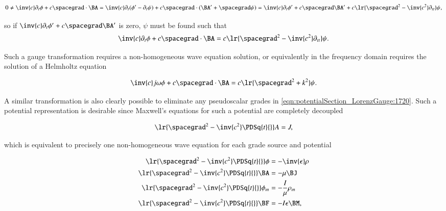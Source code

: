 \begin{dmath}\label{eqn:potentialSection_LorenzGauge:1680}
0 \ne
\inv{c} \partial_t \phi + c \spacegrad \cdot \BA
=
\inv{c} \partial_t (\phi' - \partial_t \psi) + c \spacegrad \cdot (\BA' + \spacegrad \psi)
=
\inv{c} \partial_t \phi' + c \spacegrad \BA'
+ c \lr{ \spacegrad^2 - \inv{c^2} \partial_{tt} } \psi,
\end{dmath}

so if \( \inv{c} \partial_t \phi' + c \spacegrad \BA' \) is zero, \( \psi \) must be found such that
\begin{dmath}\label{eqn:potentialSection_LorenzGauge:1700}
\inv{c} \partial_t \phi + c \spacegrad \cdot \BA
= c \lr{ \spacegrad^2 - \inv{c^2} \partial_{tt} } \psi.
\end{dmath}

Such a gauge transformation requires a non-homogeneous wave equation solution, or equivalently in the frequency domain requires the solution of a Helmholtz equation

\begin{dmath}\label{eqn:potentialSection_LorenzGauge:1740}
\inv{c} j \omega \phi + c \spacegrad \cdot \BA
= c \lr{ \spacegrad^2 + k^2 } \psi.
\end{dmath}

A similar transformation is also clearly possible to eliminate any pseudoscalar grades in \cref{eqn:potentialSection_LorenzGauge:1720}.
Such a potential representation is desirable since
Maxwell's equations for such a potential are completely decoupled

\begin{dmath}\label{eqn:potentialSection_LorenzGauge:1760}
\lr{ \spacegrad^2 - \inv{c^2} \PDSq{t}{} } A = J,
\end{dmath}

which is equivalent to precisely one non-homogeneous wave equation for each grade source and potential

\begin{dmath}\label{eqn:potentialSection_LorenzGauge:1600}
\begin{aligned}
\lr{ \spacegrad^2 - \inv{c^2} \PDSq{t}{} } \phi &= - \inv{\epsilon} \rho \\
\lr{ \spacegrad^2 - \inv{c^2} \PDSq{t}{} } \BA &= - \mu \BJ \\
\lr{ \spacegrad^2 - \inv{c^2} \PDSq{t}{} } \phi_m &= - \frac{I}{\mu} \rho_m \\
\lr{ \spacegrad^2 - \inv{c^2} \PDSq{t}{} } \BF &= - I \epsilon \BM,
\end{aligned}
\end{dmath}


